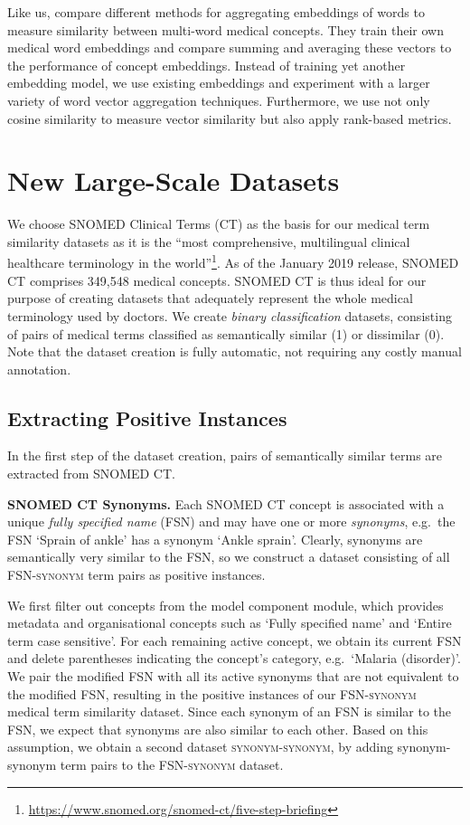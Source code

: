 \documentclass[letterpaper]{article} %
\newcommand{\lab}[1]{`#1'}
\newcommand{\dataset}[1]{\textsc{#1}}
\begin{document}
Like us, \citeauthor{HenryCM2018}  compare different methods for aggregating embeddings of words to measure similarity between multi-word medical concepts. They train their own medical word embeddings 
and compare summing and averaging these vectors to the performance of concept embeddings.
Instead of training yet another embedding model, we use existing embeddings and experiment with a larger variety of word vector aggregation techniques. Furthermore, we use not only cosine similarity to measure vector similarity but also apply rank-based metrics.


\section{New Large-Scale Datasets}
We choose SNOMED Clinical Terms (CT) as the basis for our medical term similarity datasets as it is the ``most comprehensive, multilingual clinical healthcare terminology in the world''\footnote{\url{https://www.snomed.org/snomed-ct/five-step-briefing}}. 
As of the January 2019 release, SNOMED CT comprises 349,548 medical concepts. 
SNOMED CT is thus ideal for our purpose of creating datasets that adequately represent the whole medical terminology used by doctors.
We create \emph{binary classification} datasets, consisting of pairs of medical terms classified as semantically similar (1) or dissimilar (0).
Note that the dataset creation is fully automatic, not requiring any costly manual annotation. 

\subsection{Extracting Positive Instances}
In the first step of the dataset creation, pairs of semantically similar terms are extracted from SNOMED CT.

\noindent\textbf{SNOMED CT Synonyms.}
Each SNOMED CT concept is associated with a unique \emph{fully specified name} (FSN) and may have one or more \emph{synonyms}, e.g.~the FSN \lab{Sprain of ankle} has a synonym \lab{Ankle sprain}.
Clearly, synonyms are semantically very similar to the FSN, so we construct a dataset consisting of all \dataset{FSN-synonym} term pairs as positive instances.

We first filter out 
concepts from the model component module, which provides metadata and organisational concepts such as \lab{Fully specified name} and \lab{Entire term case sensitive}.
For each remaining active concept, we obtain its current FSN and delete parentheses indicating the concept's category, e.g.~\lab{Malaria (disorder)}. We pair the modified FSN with all its active synonyms that are not equivalent to the modified FSN, resulting in the positive instances of our \dataset{FSN-synonym} medical term similarity dataset.
Since each synonym of an FSN is similar to the FSN, we expect that synonyms are also similar to each other. Based on this assumption, we obtain a second dataset \dataset{synonym-synonym}, by adding synonym-synonym term pairs to the \dataset{FSN-synonym} dataset.
\end{document}
